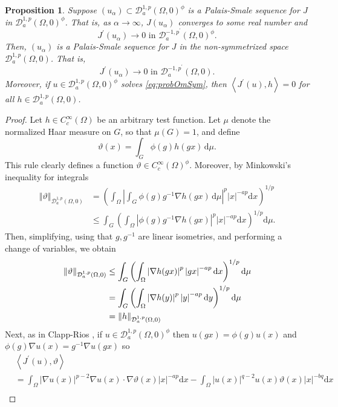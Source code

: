\documentclass[10pt, reqno]{amsart}
\newcommand{\Om}{\Omega}
\newcommand{\abs}[1]{\left\vert #1 \right\vert}
\newcommand{\norm}[1]{\left\Vert #1 \right\Vert}
\newcommand{\inner}[1]{\left\langle#1\right\rangle}
\newcommand{\D}{\mathcal{D}}
\renewcommand{\d}{\mathrm{d}}
\numberwithin{equation}{section}
\theoremstyle{definition}
\theoremstyle{remark}
\theoremstyle{plain}
\newtheorem{prop}{Proposition}[section]
\begin{document}
	
	\begin{prop}\label{prop:PSSymmetry}
		Suppose $(u_\alpha) \subset \D^{1,p}_a(\Om,0)^\phi$ is a Palais-Smale sequence for $J$ in $\D_a^{1,p}(\Om, 0)^\phi$. That is, as $\alpha \to \infty$, $J(u_\alpha)$ converges to some real number and
		\[
		J^\prime(u_\alpha) \to 0 \text{ in } \D^{-1,p^\prime}_a(\Om,0)^\phi.
		\]
		Then, $(u_\alpha)$ is a Palais-Smale sequence for $J$ in the non-symmetrized space $\D_a^{1,p}(\Om, 0)$. That is,
		\[
		J^\prime(u_\alpha) \to 0 \text{ in } \D^{-1,p^\prime}_a(\Om,0).
		\]
		Moreover, if $u \in \D_a^{1,p}(\Om,0)^\phi$ solves \eqref{eq:probOmSym}, then $\inner{J^\prime(u), h} = 0$ for all $h \in \D_a^{1,p}(\Om,0)$.
	\end{prop}
	\begin{proof}
		Let $h \in C_c^\infty(\Om)$ be an arbitrary test function. Let $\mu$ denote the normalized Haar measure on $G$, so that $\mu(G) = 1$, and define
		$$
		\vartheta(x) = \int_G\phi(g)h(gx)\,\d\mu.
		$$
		This rule clearly defines a function $\vartheta \in C_c^\infty(\Om)^\phi$. Moreover, by Minkowski's inequality for integrals 
		\[
		\begin{aligned}
			\norm{\vartheta}_{\D_a^{1,p}(\Om, 0)}
			&=\left(\int_\Om \abs{\int_G\phi(g) g^{-1}\nabla h(gx)\,\d\mu}^p \abs{x}^{-ap}\d{x}\right)^{1/p}\\
			&\le \int_G \left(\int_\Om \abs{\phi(g) g^{-1}\nabla h(gx)}^p\abs{x}^{-ap}\d{x}\right)^{1/p}\d\mu.
		\end{aligned}
		\]
		Then, simplifying, using that $g, g^{-1}$ are linear isometries, and performing a change of variables, we obtain
		\begin{align}
			\norm{\vartheta}_{\D_a^{1,p}(\Om, 0)}
			&\le\int_G\left(\int_\Om \abs{\nabla h(gx)}^p\abs{gx}^{-ap}\d{x}\right)^{1/p}\d\mu\notag\\
			&=\int_G\left(\int_\Om \abs{\nabla h(y)}^p\abs{y}^{-ap}\d{y}\right)^{1/p}\d\mu\notag\\
			&=\norm{h}_{\D_a^{1,p}(\Om, 0)}\label{eq:sym_norm_comp}
		\end{align}
		Next, as in Clapp-Rios \cite[Lemma A.1]{clappRios}, if $u\in \D_a^{1,p}(\Om , 0)^\phi$ then $u(gx) = \phi(g)u(x)$ and $\phi(g)\nabla u(x) = g^{-1}\nabla u (gx)$ so
		\[
		\begin{aligned}
			&\inner{J^\prime(u), \vartheta}\\
			&= \int_{\Om}\abs{\nabla u(x)}^{p-2}\nabla u(x) \cdot\nabla \vartheta(x)\abs{x}^{-ap}\d{x} - \int_\Om \abs{u(x)}^{q-2}u(x)\vartheta(x)\abs{x}^{-bq}\d{x}\\

\end{aligned}\]
\end{proof}
\end{document}
